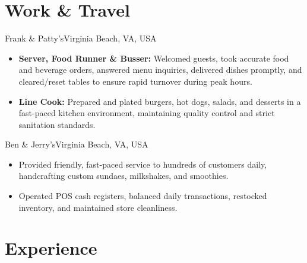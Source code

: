 \documentclass[11pt, a4paper]{moderncv}
\begin{document}
\section{Work \& Travel}

%
        {Frank \& Patty's}{Virginia Beach, VA, USA}{}{
  \begin{itemize}
    \item \textbf{Server, Food Runner \& Busser:} Welcomed guests, took accurate food and beverage orders, answered menu inquiries, delivered dishes promptly, and cleared/reset tables to ensure rapid turnover during peak hours.
    \item \textbf{Line Cook:} Prepared and plated burgers, hot dogs, salads, and desserts in a fast-paced kitchen environment, maintaining quality control and strict sanitation standards.
  \end{itemize}
}

%
        {Ben \& Jerry's}{Virginia Beach, VA, USA}{}{
  \begin{itemize}
    \item Provided friendly, fast-paced service to hundreds of customers daily, handcrafting custom sundaes, milkshakes, and smoothies.
    \item Operated POS cash registers, balanced daily transactions, restocked inventory, and maintained store cleanliness.
  \end{itemize}
}

\section{Experience}

\end{document}

